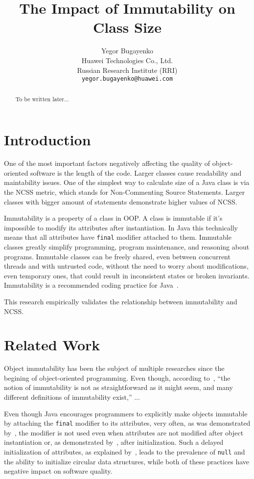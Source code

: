 \documentclass[12pt]{article}
\title{The Impact of Immutability on Class Size}
\author{Yegor Bugayenko\\Huawei Technologies Co., Ltd.\\Russian Research Institute (RRI)\\\texttt{yegor.bugayenko@huawei.com}}{}{}
\begin{document}
\raggedbottom
\maketitle

\begin{abstract}
To be written later...
\end{abstract}

\section{Introduction}

One of the most important factors negatively affecting the quality
of object-oriented software is the length of the code. Larger classes
cause readability and maintability issues. One of the simplest way
to calculate size of a Java class is via the NCSS metric, which
stands for Non-Commenting Source Statements. Larger classes with bigger
amount of statements demonstrate higher values of NCSS.

Immutability is a property of a class in OOP. A class is immutable if
it's impossible to modify its attributes after instantiation. In Java this
technically means that all attributes have \texttt{final} modifier attached
to them.
Immutable classes greatly simplify programming, program maintenance, and
reasoning about programs. Immutable classes can be freely shared, even between
concurrent threads and with untrusted code, without the need to worry
about modifications, even temporary ones, that could result in
inconsistent states or broken invariants.
Immutability is a recommended coding practice for Java~\cite{bloch2016}.

This research empirically validates the relationship between immutability
and NCSS.

\section{Related Work}

Object immutability has been the subject of multiple researches since
the begining of object-oriented programming. Even though, according to~\cite{potanin2013},
``the notion of immutability is not as straightforward as it might seem, and many
different definitions of immutability exist,'' ...

Even though Java encourages programmers to explicitly make objects immutable
by attaching the \texttt{final} modifier to its attributes, very often, as was
demonstrated by~\cite{unkel2008}, the modifier is not used even when
attributes are not modified after object instantiation or, as demonstrated
by~\cite{nelson2012}, after initialization. Such a delayed initialization of attributes, as
explained by~\cite{fahndrich2007}, leads to the prevalence of \texttt{null}
and the ability to initialize circular data structures, while both of these
practices have negative impact on software quality.
\end{document}
